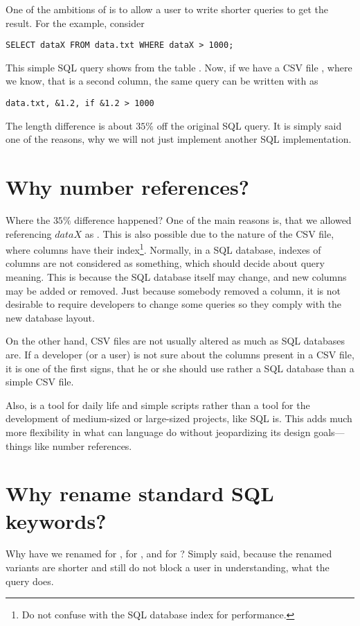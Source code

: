 One of the ambitions of  is to allow a user to write shorter queries to get the result. For the example,
consider

\begin{verbatim}
SELECT dataX FROM data.txt WHERE dataX > 1000;
\end{verbatim}

This simple SQL query shows  from the table . 
Now, if we have a CSV file , where we know, that  is a second column, the same query can 
be written with  as

\begin{verbatim}
data.txt, &1.2, if &1.2 > 1000
\end{verbatim}

The length difference is about $35\%$ off the original SQL query. It is simply said one of the reasons, 
why we will not just implement another SQL implementation.

\section{Why number references?}
Where the $35\%$ difference happened? One of the main reasons is, that we allowed referencing $dataX$ as .
This is also possible due to the nature of the CSV file, where columns have their index\footnote{Do not confuse with the SQL database index for performance.}. 
Normally, in a SQL database, indexes of columns are not considered as something, which should decide about query meaning.
This is because the SQL database itself may change, and new columns may be added or removed. Just because somebody removed a column, 
it is not desirable to require developers to change some queries so they comply with the new database layout.

On the other hand, CSV files are not usually altered as much as SQL databases are. 
If a developer (or a user) is not sure about the columns present in a CSV file, it is one of the first signs, that
he or she should use rather a SQL database than a simple CSV file.

Also,  is a tool for daily life and simple scripts rather than a tool for the development of medium-sized or
large-sized projects, like SQL is. This adds much more flexibility in what can language do without jeopardizing its design goals---things like number references.

\section{Why rename standard SQL keywords?}
Why have we renamed  for ,  for , and  for ? Simply said, because the renamed variants are shorter and still do not block a user in understanding, what the query does.

